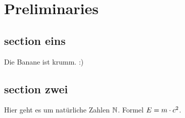 \chapter{Preliminaries}

\section{section eins}

Die Banane ist krumm. :) \cite{gentry2009}

\section{section zwei}

Hier geht es um natürliche Zahlen $\mathbb{N}$. Formel $E = m \cdot c^2$.
